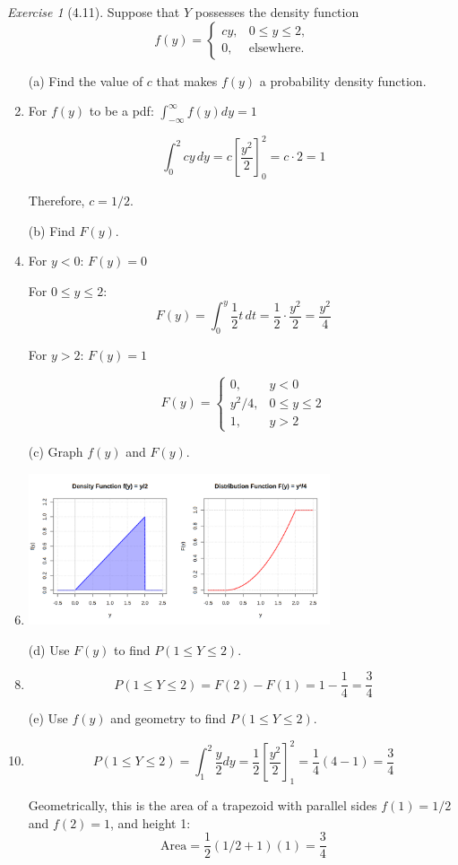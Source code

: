 \documentclass[12pt]{amsart}
\makeatletter
\theoremstyle{remark}
\newtheorem*{exercise}{Exercise}%
\renewenvironment{proof}[1][\proofname]{\par\doublespacing
  \pushQED{\qed}%
  \normalfont \topsep6\p@\@plus6\p@\relax
  \list{}{%
    \settowidth{\leftmargin}{\itshape\proofname:\hskip\labelsep}%
    \setlength{\labelwidth}{0pt}%
    \setlength{\itemindent}{-\leftmargin}%
  }%
  \item[\hskip\labelsep\itshape#1\@addpunct{:}]\ignorespaces
}{%
  \popQED\endlist\@endpefalse
  \singlespacing
}
\theoremstyle{mycomment}
\makeatother
\begin{document}
\begin{exercise}[4.11]
Suppose that $Y$ possesses the density function
$$f(y) = \begin{cases}
cy, & 0 \leq y \leq 2, \\
0, & \text{elsewhere}.
\end{cases}$$

\begin{enumerate}
    \item[(a)] Find the value of $c$ that makes $f(y)$ a probability density function.
\begin{proof}[Solution]
 For $f(y)$ to be a pdf: $\int_{-\infty}^{\infty} f(y) dy = 1$
	
	$$\int_0^2 cy \, dy = c \left[\frac{y^2}{2}\right]_0^2 = c \cdot 2 = 1$$
	
	Therefore, $c = 1/2$.
\end{proof}
    \item[(b)] Find $F(y)$.
\begin{proof}[Solution]
 For $y < 0$: $F(y) = 0$
	
	For $0 \leq y \leq 2$:
	$$F(y) = \int_0^y \frac{1}{2}t \, dt = \frac{1}{2} \cdot \frac{y^2}{2} = \frac{y^2}{4}$$
	
	For $y > 2$: $F(y) = 1$
	
	$$F(y) = \begin{cases}
	0, & y < 0 \\
	y^2/4, & 0 \leq y \leq 2 \\
	1, & y > 2
	\end{cases}$$
\end{proof}
    \item[(c)] Graph $f(y)$ and $F(y)$.
\begin{proof}[Solution]
 	\includegraphics[width=0.7\textwidth]{exercise_4_11c.png}
\end{proof}
    \item[(d)] Use $F(y)$ to find $P(1 \leq Y \leq 2)$.
\begin{proof}[Solution]
 $$P(1 \leq Y \leq 2) = F(2) - F(1) = 1 - \frac{1}{4} = \frac{3}{4}$$
\end{proof}
    \item[(e)] Use $f(y)$ and geometry to find $P(1 \leq Y \leq 2)$.
\begin{proof}[Solution]
 	$$P(1 \leq Y \leq 2) = \int_1^2 \frac{y}{2} dy = \frac{1}{2} \left[\frac{y^2}{2}\right]_1^2 = \frac{1}{4}(4 - 1) = \frac{3}{4}$$
	
	Geometrically, this is the area of a trapezoid with parallel sides $f(1) = 1/2$ and $f(2) = 1$, and height 1:
	$$\text{Area} = \frac{1}{2}(1/2 + 1)(1) = \frac{3}{4}$$
\end{proof}
\end{enumerate} 
\end{exercise}
\end{document}
